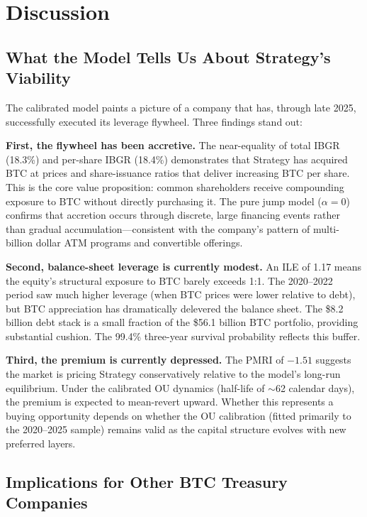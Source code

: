 \section{Discussion}
\label{sec:discussion}

\subsection{What the Model Tells Us About Strategy's Viability}

The calibrated model paints a picture of a company that has, through late 2025, successfully executed its leverage flywheel. Three findings stand out:

\textbf{First, the flywheel has been accretive.} The near-equality of total IBGR (18.3\%) and per-share IBGR (18.4\%) demonstrates that Strategy has acquired BTC at prices and share-issuance ratios that deliver increasing BTC per share. This is the core value proposition: common shareholders receive compounding exposure to BTC without directly purchasing it. The pure jump model ($\alpha = 0$) confirms that accretion occurs through discrete, large financing events rather than gradual accumulation---consistent with the company's pattern of multi-billion dollar ATM programs and convertible offerings.

\textbf{Second, balance-sheet leverage is currently modest.} An ILE of 1.17 means the equity's structural exposure to BTC barely exceeds 1:1. The 2020--2022 period saw much higher leverage (when BTC prices were lower relative to debt), but BTC appreciation has dramatically delevered the balance sheet. The \$8.2 billion debt stack is a small fraction of the \$56.1 billion BTC portfolio, providing substantial cushion. The 99.4\% three-year survival probability reflects this buffer.

\textbf{Third, the premium is currently depressed.} The PMRI of $-1.51$ suggests the market is pricing Strategy conservatively relative to the model's long-run equilibrium. Under the calibrated OU dynamics (half-life of $\sim$62 calendar days), the premium is expected to mean-revert upward. Whether this represents a buying opportunity depends on whether the OU calibration (fitted primarily to the 2020--2025 sample) remains valid as the capital structure evolves with new preferred layers.

\subsection{Implications for Other BTC Treasury Companies}

